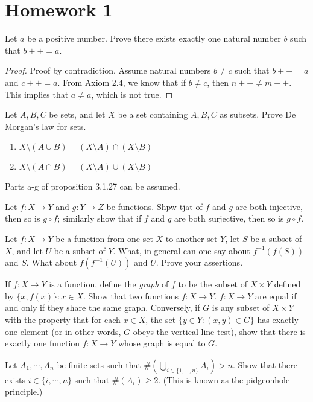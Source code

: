 \documentclass[12pt]{article}
\newenvironment{problem}[2][Problem]{\begin{trivlist}
     \item[\hskip \labelsep {\bfseries #1}\hskip \labelsep {\bfseries #2.}]}
{\end{trivlist}}
\begin{document}
\section{Homework 1}

\begin{problem}{2.2.2}
Let $a$ be a positive number. Prove there exists exactly one natural number $b$ such that $b++ = a$.
\end{problem}

\begin{proof}
  Proof by contradiction. Assume natural numbers $b \neq c$ such that $b++ = a$ and $c++ = a$. From Axiom 2.4, we know that if $b \neq c$, then $n++ \neq m++$. This implies that $a \neq a$, which is not true.

\end{proof}

\begin{problem}{3.1.6}
Let $A, B, C$ be sets, and let $X$ be a set containing $A, B, C$ as subsets. Prove De Morgan's law for sets.
\begin{enumerate}
    \item $X \setminus (A \cup B) = (X \setminus A) \cap (X \setminus B)$
    \item $X \setminus (A \cap B) = (X \setminus A) \cup (X \setminus B)$
\end{enumerate}
Parts a-g of proposition 3.1.27 can be assumed.
\end{problem}

\begin{problem}{3.3.2}
Let $f: X \to Y$ and $g: Y \to Z$ be functions. Shpw tjat of $f$ and $g$ are both injective, then so is $g \circ f$; similarly show that if $f$ and $g$ are both surjective, then so is $g \circ f$.
\end{problem}

\begin{problem}{3.4.2}
Let $f: X \to Y$ be a function from one set $X$ to another set $Y$, let $S$ be a subset of $X$, and let $U$ be a subset of $Y$. What, in general can one say about $f^{-1}(f(S))$ and $S$. What about $f(f^{-1}(U))$ and $U$. Prove your assertions.
\end{problem}

\begin{problem}{3.5.10}
If $f: X \to Y$ is a function, define the \emph{graph} of $f$ to be the subset of $X \times Y$ defined by $\{x, f(x)\} : x \in X$. Show that two functions $f: X \to Y$. $\bar{f}: X \to Y$ are equal if and only if they share the same graph. Conversely, if $G$ is any subset of $X \times Y$ with the property that for each $x \in X$, the set $\{y \in Y : (x,y) \in G\}$ has exactly one element (or in other words, $G$ obeys the vertical line test), show that there is exactly one function $f: X \to Y$ whose graph is equal to $G$.
\end{problem}

\begin{problem}{3.6.10}
Let $A_1, \cdots, A_n$ be finite sets such that $\#(\bigcup_{i \in \{1, \cdots, n\}} A_i) > n$. Show that there exists $i \in \{i, \cdots, n\}$ such that $\#(A_i) \ge 2$. (This is known as the pidgeonhole principle.)
\end{problem}
\end{document}

